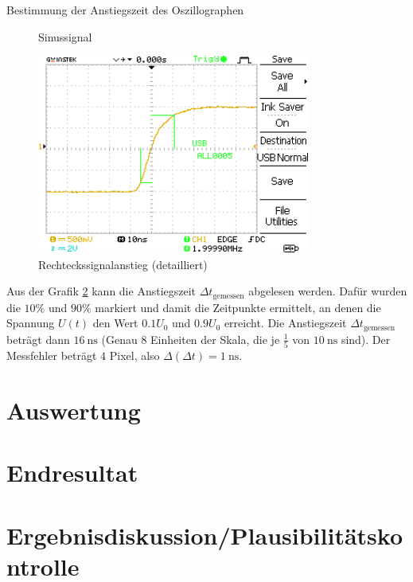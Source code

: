 \documentclass[ngerman]{scrartcl}
\theoremstyle{definition}
\begin{document}
\begin{aufgabe}{Bestimmung der Anstiegszeit des Oszillographen}
\begin{unteraufgabe}
\begin{figure}[H]
					\caption{Sinussignal}
					\label{fig:A0002DS}
				\end{figure}
			\end{unteraufgabe}
			\begin{unteraufgabe}
				\begin{figure}[H]
					\centering
					\includegraphics[width=0.8\textwidth]{MesswerteVersuch0/A0005DS.png}
					\caption{Rechteckssignalanstieg (detailliert)}
					\label{fig:A0005DS}
				\end{figure}
				Aus der Grafik \ref{fig:A0005DS} kann die Anstiegszeit $\Delta t_\mathrm{gemessen}$ abgelesen werden. Dafür wurden die $10\%$ und $90\%$ markiert und damit die Zeitpunkte ermittelt, an denen die Spannung $U(t)$ den Wert $0.1 U_0$ und $0.9 U_0$ erreicht. Die Anstiegszeit $\Delta t_\mathrm{gemessen}$ beträgt dann $\SI{16}{\nano\second}$ (Genau $8$ Einheiten der Skala, die je $\frac{1}{5}$ von $\SI{10}{\nano\second}$ sind). Der Messfehler beträgt $4$ Pixel, also $\Delta(\Delta t) =  \SI{1}{\nano\second}$. 
			\end{unteraufgabe}

		\end{aufgabe}
		
		
		\section{Auswertung}
		\section{Endresultat}
		\section{Ergebnisdiskussion/Plausibilitätskontrolle}
\end{document}
